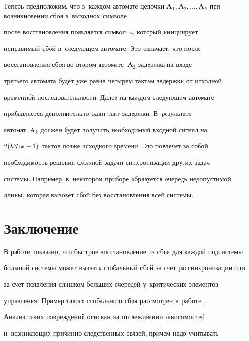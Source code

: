   


  Теперь предположим, что в~каж\-дом автомате цепочки $\mathbf{A}_1, 


\mathbf{A}_2, \ldots , \mathbf{A}_k$ при возникновении сбоя в~вы\-ход\-ном символе 


после вос\-ста\-нов\-ле\-ния появляется сим\-вол~$a$, который ини\-ци\-ир\-ует 


исправимый сбой в~сле\-ду\-ющем автомате. Это означает, что после 


вос\-ста\-нов\-ле\-ния сбоя во втором автомате~\textbf{A}$_2$ задержка на входе 


треть\-его автомата будет уже равна четырем тактам за\-держ\-ки от исходной 


временн\'{о}й по\-сле\-до\-ва\-тель\-ности. Далее на каж\-дом сле\-ду\-ющем автомате 


при\-бав\-ля\-ет\-ся дополнительно один такт за\-держ\-ки. В~результате 


автомат~\textbf{A}$_k$ дол\-жен будет получить необходимый вход\-ной сигнал на 


$2(k\hm-1)$ так\-тов позже исходного времени. Это по\-вле\-чет за собой  


не\-об\-хо\-ди\-мость решения слож\-ной задачи синхронизации других задач 


сис\-те\-мы. Например, в~некотором приборе образуется очередь не\-до\-пус\-ти\-мой 


длины, которая вызовет сбой без вос\-ста\-нов\-ле\-ния всей сис\-темы.





\section{Заключение}


  


  В работе показано, что быстрое восстановление из сбоя для каждой подсистемы 


большой сис\-те\-мы может вызвать глобальный сбой за счет рассинхронизации или 


за счет появления слиш\-ком больших очередей у~критических элементов 


управ\-ле\-ния. Пример такого глобального сбоя рас\-смот\-рен в~работе~\cite{7-gru}. 


Анализ таких по\-вреж\-де\-ний основан на отслеживании зависимостей 


и~возникающих при\-чин\-но-след\-ст\-вен\-ных связей, причем надо учитывать 


